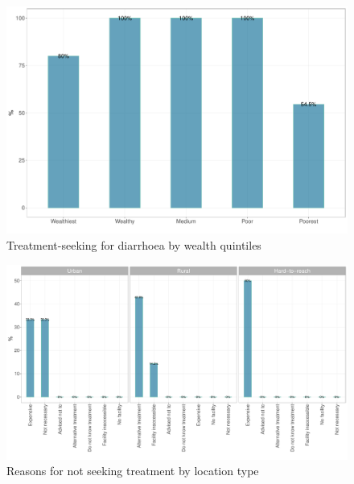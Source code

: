 \documentclass[12pt,a4paper]{article}
\begin{document}
\begin{figure}[H]

{\centering \includegraphics{kayinReport_files/figure-latex/diarrhoea2plot-1} 

}

\caption{Treatment-seeking for diarrhoea by wealth quintiles}\label{fig:diarrhoea2plot}
\end{figure}

\begin{figure}[H]

{\centering \includegraphics{kayinReport_files/figure-latex/diarrhoea3plot-1} 

}

\caption{Reasons for not seeking treatment by location type}\label{fig:diarrhoea3plot}
\end{figure}
\end{document}
